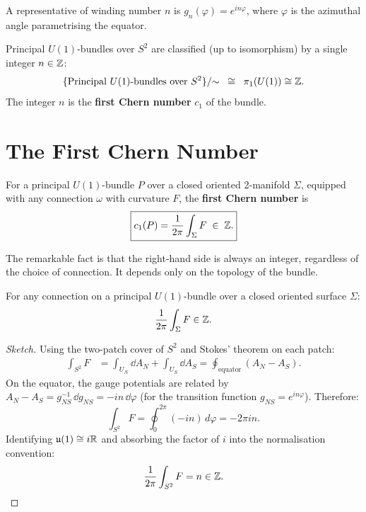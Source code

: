 A representative of winding number $n$ is $g_n(\varphi) = e^{in\varphi}$, where $\varphi$ is the azimuthal angle parametrising the equator.

\begin{theorem}
Principal $U(1)$-bundles over $S^2$ are classified (up to isomorphism) by a single integer $n \in \mathbb{Z}$:
\begin{equation}
\{\text{Principal } U(1)\text{-bundles over } S^2\} / {\sim} \;\;\cong\;\; \pi_1(U(1)) \cong \mathbb{Z}.
\end{equation}
The integer $n$ is the \textbf{first Chern number} $c_1$ of the bundle.
\end{theorem}

\section{The First Chern Number}

\begin{definition}
For a principal $U(1)$-bundle $P$ over a closed oriented 2-manifold $\Sigma$, equipped with any connection $\omega$ with curvature $F$, the \textbf{first Chern number} is
\begin{equation}
\boxed{c_1(P) = \frac{1}{2\pi}\int_\Sigma F \;\in\; \mathbb{Z}.}
\end{equation}
\end{definition}

The remarkable fact is that the right-hand side is always an integer, regardless of the choice of connection. It depends only on the topology of the bundle.

\begin{theorem}[Integrality]
For any connection on a principal $U(1)$-bundle over a closed oriented surface $\Sigma$:
\begin{equation}
\frac{1}{2\pi}\int_\Sigma F \in \mathbb{Z}.
\end{equation}
\end{theorem}

\begin{proof}[Sketch]
Using the two-patch cover of $S^2$ and Stokes' theorem on each patch:
\begin{align}
\int_{S^2} F &= \int_{U_N} \dd A_N + \int_{U_S} \dd A_S = \oint_{\text{equator}} (A_N - A_S).
\end{align}
On the equator, the gauge potentials are related by $A_N - A_S = g_{NS}^{-1}\,\dd g_{NS} = -in\,\dd\varphi$ (for the transition function $g_{NS} = e^{in\varphi}$). Therefore:
\begin{equation}
\int_{S^2} F = \oint_0^{2\pi} (-in)\,d\varphi = -2\pi i n.
\end{equation}
Identifying $\mathfrak{u}(1) \cong i\mathbb{R}$ and absorbing the factor of $i$ into the normalisation convention:
\begin{equation}
\frac{1}{2\pi}\int_{S^2} F = n \in \mathbb{Z}.
\end{equation}
\end{proof}


